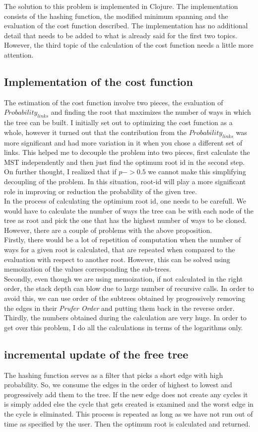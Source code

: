 \documentclass[12pt]{article}
\begin{document}
The solution to this problem is implemented in Clojure. The implementation consists of the hashing function, the modified minimum spanning and the evaluation of the cost function described. The implementation has no additional detail that needs to be added to what is already said for the first two topics. However, the third topic of the calculation of the cost function needs a little more  attention.

\subsection{Implementation of the cost function}
The estimation of the cost function involve two pieces, the evaluation of $Probability_{links}$ and finding the root that maximizes the number of ways in which the tree can be built. I initially set out to optimizing the cost function as a whole, however it turned out that the contribution from the $Probability_{links}$ was more significant and had more variation in it when you chose a different set of links. This helped me to decouple the problem into two pieces, first calculate the MST independently and then just find the optimum root id in the second step. On further thought, I realized that if $p->0.5$ we cannot make this simplifying decoupling of the problem. In this situation, root-id will play a more significant role in improving or reduction the probability of the given tree.\\
In the process of calculating the optimium root id, one needs to be carefull. We would have to calculate the number of ways the tree can be with each node of the tree as root and pick the one that has the highest number of ways to be cloned. However, there are a couple of problems with the above proposition. \\
 Firstly, there would be a lot of repetition of computation when the number of ways for a given root is calculated, that are repeated when compared to the evaluation with respect to another root. However, this can be solved using memoization of the values corresponding the sub-trees. \\
Secondly, even though we are using memoization, if not calculated in the right order, the stack depth can blow due to large number of recursive calls. In order to avoid this, we can use order of the subtrees obtained by progressively removing the edges in their \emph{Prufer Order} and putting them back in the reverse order. \\
 Thirdly, the numbers obtained during the calculation are very huge. In order to get over this problem, I do all the calculations in terms of the logarithms only.
\subsection{incremental update of the free tree}
The hashing function serves as a filter that picks a short edge with high probability. So, we consume the edges in the order of highest to lowest and progressively add them to the tree. If the new edge does not create any cycles it is simply added else the cycle that gets created is examined and the worst edge in the cycle is eliminated. This process is repeated as long as we have not run out of time as specified by the user. Then the optimum root is calculated and returned.
\end{document}
